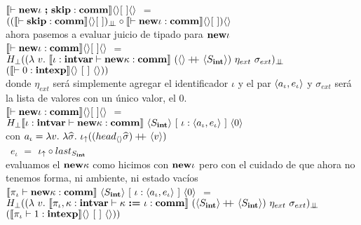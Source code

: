 \noindent
$\semBrcks{\vdash \cseq{\cnew \iota \ }{ \ \cskip} : \commt}\emptyshape\emptyenv\emptystate$ $=$
$((\llbracket \vdash \textbf{skip} : \textbf{comm} \rrbracket\langle  \rangle[ \ ])_{\bot \!\!\! \bot}
\circ 
\llbracket \vdash \textbf{new} \iota : \textbf{comm} \rrbracket\langle  \rangle[ \ ]) \langle  \rangle$\\

ahora pasemos a evaluar juicio de tipado para $\textbf{new} \iota$\\

\noindent
$\llbracket \vdash \textbf{new} \iota : \textbf{comm} \rrbracket\langle  \rangle[ \ ]\langle  \rangle$
$=$ \\ \indent \indent
$H_{\bot} ((\lambda \ v . \ \semBrcks{\iota:\intvar \vdash \cnew \kappa : \commt}
		\ (\emptyshape \concat\lrangles{S_\intt}) \ \eta_{ext} \ \sigma_{ext})_{\dbot}$
\\ \indent \indent  \indent  \indent  \indent \indent  \indent
\indent \indent \indent \indent \indent \indent \indent
\indent \indent \indent
$(\semBrcks{\vdash 0 : \intexp}\emptyshape \ \emptyenv \ \emptystate))$\\

donde $\eta_{ext}$ ser\'a simplemente agregar el identificador $\iota$ y el
par $\langle a_\iota,e_\iota \rangle$ y $\sigma_{ext}$ ser\'a la lista de valores
con un \'unico valor, el $0$.\\

\noindent
$\llbracket \vdash \textbf{new} \iota : \textbf{comm} \rrbracket\langle  \rangle[ \ ]\langle  \rangle$
$=$
$H_{\bot} \semBrcks{\iota:\intvar \vdash \cnew \kappa : \commt}
				    \ \lrangles{S_\intt} \ 
		  	        [ \ \iota : \lrangles{a_\iota,e_\iota} \ ] \ \lrangles{0}$\\

con $a_\iota = \lambda v. \ \lambda \widehat{\sigma} . \ \iota_{\uparrow} 
				((head_{\langle  \rangle} \widehat{\sigma}) +\kern-1.3ex+\kern0.8ex \langle v \rangle)$\\
\indent \indent \ 
$e_\iota$ $=$ $ \iota_{\uparrow} \circ last_{S_{\textbf{int}}}$\\

evaluamos el $\textbf{new} \kappa$ como hicimos con $\textbf{new} \iota$ pero con el cuidado
de que ahora no tenemos forma, ni ambiente, ni estado vac\'ios\\

\noindent
$\semBrcks{\pi_\iota \vdash \cnew \kappa : \commt}
	\ \lrangles{S_\intt} \ 
	[ \ \iota : \lrangles{a_\iota,e_\iota} \ ] \ \lrangles{0}$ $=$ \\
\indent \indent
$H_{\bot} ((\lambda \ v . \ \semBrcks{\pi_\iota,\kappa:\intvar \vdash \assig{\kappa}{\iota}: \commt}
		\ (\lrangles{S_\intt} \concat\lrangles{S_\intt}) \ \eta_{ext} \ \sigma_{ext})_{\dbot}$
\\ \indent \indent  \indent  \indent  \indent \indent  \indent
\indent \indent \indent \indent \indent \indent \indent
\indent \indent \indent
$(\llbracket \pi_\iota \vdash 1 : \textbf{intexp} \rrbracket\langle  \rangle \ [ \ ] \ \langle  \rangle))$\\

